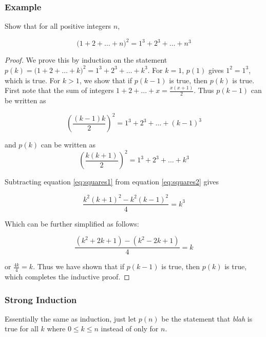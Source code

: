\documentclass[12pt]{article}
\begin{document}
\subsubsection{Example}
Show that for all positive integers $n$,
 
\[
    \big(1 + 2 + \ldots + n\big)^2 = 1^3 + 2^3 + \ldots + n^3
\]


\begin{proof}
    We prove this by induction on the statement $p(k) = \big(1 + 2 + \ldots + k\big)^2 = 1^3 + 2^3 + \ldots + k^3$. For $k = 1$, $p(1)$ gives $1^2 = 1^3$, which is true. For $k > 1$, we show that if $p(k-1)$ is true, then $p(k)$ is true. First note that the sum of integers $1 + 2 + \ldots + x = \frac{x(x+1)}{2} $. Thus $p(k-1)$ can be written as
    
    \begin{equation}\label{eq:squares1}
    \left(\frac{(k-1)k}{2}\right)^2 = 1^3 + 2^3 + \ldots + (k-1)^3
    \end{equation}
    
    and $p(k)$ can be written as
    \begin{equation}\label{eq:squares2}
    \left(\frac{k(k+1)}{2}\right)^2 = 1^3 + 2^3 + \ldots + k^3 
    \end{equation}
    
    Subtracting equation \ref{eq:squares1} from equation \ref{eq:squares2} gives 
    
    \begin{equation*}
    \frac{k^2(k+1)^2 - k^2(k-1)^2}{4} = k^3
    \end{equation*}
    
    Which can be further simplified as follows:
    
    \begin{equation*}
    \frac{(k^2+2k+1) - (k^2-2k+1)}{4} = k   
    \end{equation*}

    or $\frac{4k}{4} = k$. Thus we have shown that if $p(k-1)$ is true, then $p(k)$ is true, which completes the inductive proof.

\end{proof}

\subsubsection{Strong Induction}
Essentially the same as induction, just let $p(n)$ be the statement that \emph{blah} is true for all $k$ where $0 \le k \le n$ instead of only for $n$. 
\end{document}
